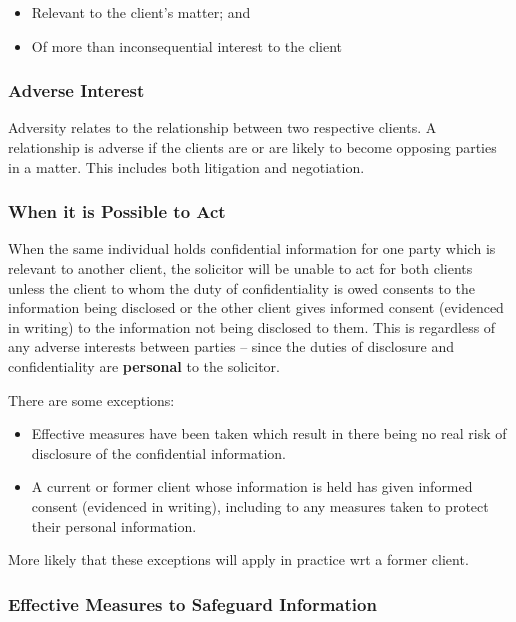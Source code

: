 \documentclass[
]{article}
\providecommand{\tightlist}{%
  \setlength{\itemsep}{0pt}\setlength{\parskip}{0pt}}
\begin{document}
\begin{itemize}
\tightlist
\item
  Relevant to the client's matter; and
\item
  Of more than inconsequential interest to the client
\end{itemize}

\hypertarget{adverse-interest}{%
\subsubsection{Adverse Interest}\label{adverse-interest}}

Adversity relates to the relationship between two respective clients. A
relationship is adverse if the clients are or are likely to become
opposing parties in a matter. This includes both litigation and
negotiation.

\hypertarget{when-it-is-possible-to-act}{%
\subsubsection{When it is Possible to
Act}\label{when-it-is-possible-to-act}}

When the same individual holds confidential information for one party
which is relevant to another client, the solicitor will be unable to act
for both clients unless the client to whom the duty of confidentiality
is owed consents to the information being disclosed or the other client
gives informed consent (evidenced in writing) to the information not
being disclosed to them. This is regardless of any adverse interests
between parties -- since the duties of disclosure and confidentiality
are \textbf{personal} to the solicitor.

There are some exceptions:

\begin{itemize}
\tightlist
\item
  Effective measures have been taken which result in there being no real
  risk of disclosure of the confidential information.
\item
  A current or former client whose information is held has given
  informed consent (evidenced in writing), including to any measures
  taken to protect their personal information.
\end{itemize}

More likely that these exceptions will apply in practice wrt a former
client.

\hypertarget{effective-measures-to-safeguard-information}{%
\subsubsection{Effective Measures to Safeguard
Information}\label{effective-measures-to-safeguard-information}}
\end{document}

